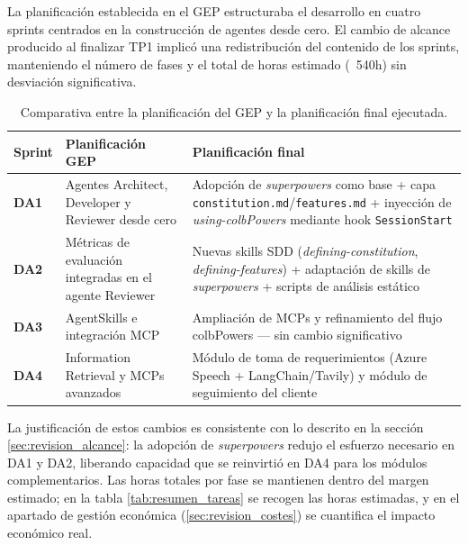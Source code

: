 \documentclass[11pt, letterpaper]{article}
\begin{document}
La planificación establecida en el GEP estructuraba el desarrollo en cuatro sprints centrados en la construcción de agentes desde cero. El cambio de alcance producido al finalizar TP1 implicó una redistribución del contenido de los sprints, manteniendo el número de fases y el total de horas estimado (~540h) sin desviación significativa.

\begin{table}[H]
\centering
\begin{tabularx}{\textwidth}{>{\centering\arraybackslash}p{1cm} >{\raggedright\arraybackslash}X >{\raggedright\arraybackslash}X}
    \toprule
    \textbf{Sprint} & \textbf{Planificación GEP} & \textbf{Planificación final} \\
    \midrule
    \textbf{DA1} & Agentes Architect, Developer y Reviewer desde cero & Adopción de \textit{superpowers} como base + capa \texttt{constitution.md}/\texttt{features.md} + inyección de \textit{using-colbPowers} mediante hook \texttt{SessionStart} \\
    \textbf{DA2} & Métricas de evaluación integradas en el agente Reviewer & Nuevas skills SDD (\textit{defining-constitution}, \textit{defining-features}) + adaptación de skills de \textit{superpowers} + scripts de análisis estático \\
    \textbf{DA3} & AgentSkills e integración MCP & Ampliación de MCPs y refinamiento del flujo colbPowers --- sin cambio significativo \\
    \textbf{DA4} & Information Retrieval y MCPs avanzados & Módulo de toma de requerimientos (Azure Speech + LangChain/Tavily) y módulo de seguimiento del cliente \\
    \bottomrule
\end{tabularx}
\caption{Comparativa entre la planificación del GEP y la planificación final ejecutada.}
\label{tab:comparativa_planificacion}
\end{table}

La justificación de estos cambios es consistente con lo descrito en la sección \ref{sec:revision_alcance}: la adopción de \textit{superpowers} redujo el esfuerzo necesario en DA1 y DA2, liberando capacidad que se reinvirtió en DA4 para los módulos complementarios. Las horas totales por fase se mantienen dentro del margen estimado; en la tabla \ref{tab:resumen_tareas} se recogen las horas estimadas, y en el apartado de gestión económica (\ref{sec:revision_costes}) se cuantifica el impacto económico real.

\newpage
\end{document}
